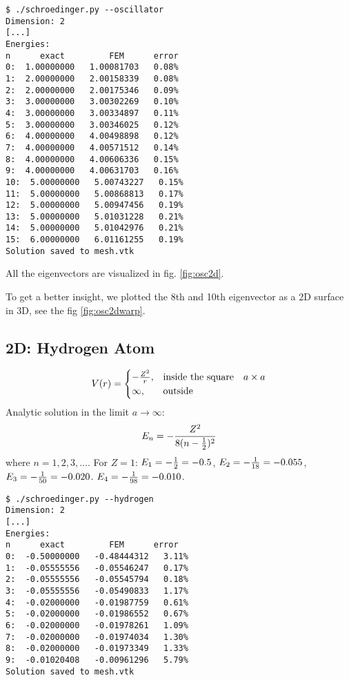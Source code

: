 \begin{lstlisting}
$ ./schroedinger.py --oscillator
Dimension: 2
[...]
Energies:
n      exact         FEM      error
0:  1.00000000   1.00081703   0.08%
1:  2.00000000   2.00158339   0.08%
2:  2.00000000   2.00175346   0.09%
3:  3.00000000   3.00302269   0.10%
4:  3.00000000   3.00334897   0.11%
5:  3.00000000   3.00346025   0.12%
6:  4.00000000   4.00498898   0.12%
7:  4.00000000   4.00571512   0.14%
8:  4.00000000   4.00606336   0.15%
9:  4.00000000   4.00631703   0.16%
10:  5.00000000   5.00743227   0.15%
11:  5.00000000   5.00868813   0.17%
12:  5.00000000   5.00947456   0.19%
13:  5.00000000   5.01031228   0.21%
14:  5.00000000   5.01042976   0.21%
15:  6.00000000   6.01161255   0.19%
Solution saved to mesh.vtk
\end{lstlisting}

All the eigenvectors are visualized in fig. \ref{fig:osc2d}.


To get a better insight, we plotted the 8th and 10th eigenvector as a 2D surface
in 3D, see the fig \ref{fig:osc2dwarp}.


\subsection{2D: Hydrogen Atom}

$$V(r)=\begin{cases}-{Z^2\over r},&\text{inside the square}\quad a\times a \\
\infty, & \text{outside}\end{cases}$$
Analytic solution in the limit $a\to\infty$:
$$E_n=-{Z^2\over8(n-{1\over2})^2}$$
where $n=1, 2, 3, \dots$.
For $Z=1$:
$E_1 = -{1\over2}=-0.5$,
$E_2 = -{1\over18}=-0.055$,
$E_3 = -{1\over50}=-0.020$.
$E_4 = -{1\over98}=-0.010$.

\begin{lstlisting}
$ ./schroedinger.py --hydrogen
Dimension: 2
[...]
Energies:
n      exact         FEM      error
0:  -0.50000000   -0.48444312   3.11%
1:  -0.05555556   -0.05546247   0.17%
2:  -0.05555556   -0.05545794   0.18%
3:  -0.05555556   -0.05490833   1.17%
4:  -0.02000000   -0.01987759   0.61%
5:  -0.02000000   -0.01986552   0.67%
6:  -0.02000000   -0.01978261   1.09%
7:  -0.02000000   -0.01974034   1.30%
8:  -0.02000000   -0.01973349   1.33%
9:  -0.01020408   -0.00961296   5.79%
Solution saved to mesh.vtk
\end{lstlisting}

